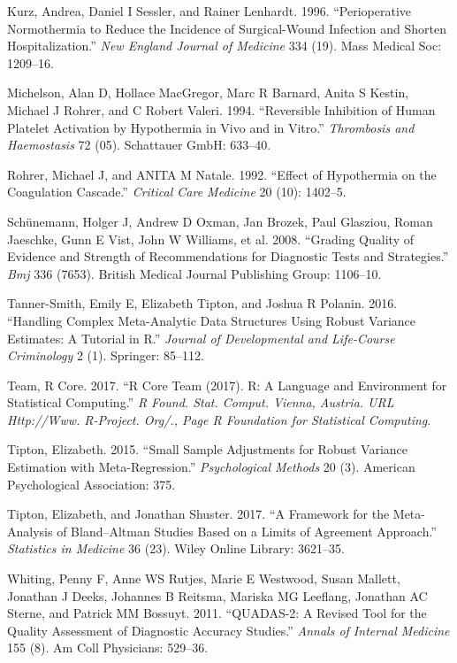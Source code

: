 \documentclass[smallextended]{svjour3}       %
\begin{document}
\leavevmode\hypertarget{ref-kurz1996perioperative}{}%
Kurz, Andrea, Daniel I Sessler, and Rainer Lenhardt. 1996.
``Perioperative Normothermia to Reduce the Incidence of Surgical-Wound
Infection and Shorten Hospitalization.'' \emph{New England Journal of
Medicine} 334 (19). Mass Medical Soc: 1209--16.

\leavevmode\hypertarget{ref-michelson1994reversible}{}%
Michelson, Alan D, Hollace MacGregor, Marc R Barnard, Anita S Kestin,
Michael J Rohrer, and C Robert Valeri. 1994. ``Reversible Inhibition of
Human Platelet Activation by Hypothermia in Vivo and in Vitro.''
\emph{Thrombosis and Haemostasis} 72 (05). Schattauer GmbH: 633--40.

\leavevmode\hypertarget{ref-rohrer1992effect}{}%
Rohrer, Michael J, and ANITA M Natale. 1992. ``Effect of Hypothermia on
the Coagulation Cascade.'' \emph{Critical Care Medicine} 20 (10):
1402--5.

\leavevmode\hypertarget{ref-schunemann2008grading}{}%
Schünemann, Holger J, Andrew D Oxman, Jan Brozek, Paul Glasziou, Roman
Jaeschke, Gunn E Vist, John W Williams, et al. 2008. ``Grading Quality
of Evidence and Strength of Recommendations for Diagnostic Tests and
Strategies.'' \emph{Bmj} 336 (7653). British Medical Journal Publishing
Group: 1106--10.

\leavevmode\hypertarget{ref-tanner2016handling}{}%
Tanner-Smith, Emily E, Elizabeth Tipton, and Joshua R Polanin. 2016.
``Handling Complex Meta-Analytic Data Structures Using Robust Variance
Estimates: A Tutorial in R.'' \emph{Journal of Developmental and
Life-Course Criminology} 2 (1). Springer: 85--112.

\leavevmode\hypertarget{ref-team2017r}{}%
Team, R Core. 2017. ``R Core Team (2017). R: A Language and Environment
for Statistical Computing.'' \emph{R Found. Stat. Comput. Vienna,
Austria. URL Http://Www. R-Project. Org/., Page R Foundation for
Statistical Computing}.

\leavevmode\hypertarget{ref-tipton2015small}{}%
Tipton, Elizabeth. 2015. ``Small Sample Adjustments for Robust Variance
Estimation with Meta-Regression.'' \emph{Psychological Methods} 20 (3).
American Psychological Association: 375.

\leavevmode\hypertarget{ref-tipton2017framework}{}%
Tipton, Elizabeth, and Jonathan Shuster. 2017. ``A Framework for the
Meta-Analysis of Bland--Altman Studies Based on a Limits of Agreement
Approach.'' \emph{Statistics in Medicine} 36 (23). Wiley Online Library:
3621--35.

\leavevmode\hypertarget{ref-whiting2011quadas}{}%
Whiting, Penny F, Anne WS Rutjes, Marie E Westwood, Susan Mallett,
Jonathan J Deeks, Johannes B Reitsma, Mariska MG Leeflang, Jonathan AC
Sterne, and Patrick MM Bossuyt. 2011. ``QUADAS-2: A Revised Tool for the
Quality Assessment of Diagnostic Accuracy Studies.'' \emph{Annals of
Internal Medicine} 155 (8). Am Coll Physicians: 529--36.



\end{document}
